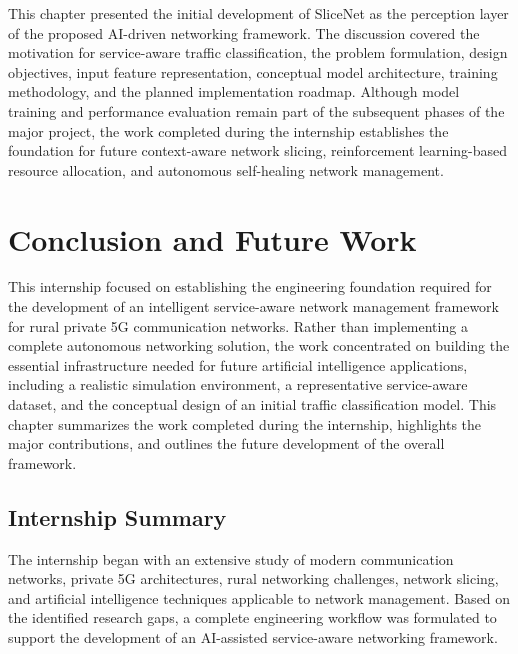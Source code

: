 \documentclass[12pt,a4paper]{report}
\begin{document}
	This chapter presented the initial development of SliceNet as the perception layer of the proposed AI-driven networking framework. The discussion covered the motivation for service-aware traffic classification, the problem formulation, design objectives, input feature representation, conceptual model architecture, training methodology, and the planned implementation roadmap. Although model training and performance evaluation remain part of the subsequent phases of the major project, the work completed during the internship establishes the foundation for future context-aware network slicing, reinforcement learning-based resource allocation, and autonomous self-healing network management.
	
	
	\chapter{Conclusion and Future Work}
	\label{chap:conclusion}
	
	This internship focused on establishing the engineering foundation required for the development of an intelligent service-aware network management framework for rural private 5G communication networks. Rather than implementing a complete autonomous networking solution, the work concentrated on building the essential infrastructure needed for future artificial intelligence applications, including a realistic simulation environment, a representative service-aware dataset, and the conceptual design of an initial traffic classification model. This chapter summarizes the work completed during the internship, highlights the major contributions, and outlines the future development of the overall framework.
	
	\section{Internship Summary}
	
	The internship began with an extensive study of modern communication networks, private 5G architectures, rural networking challenges, network slicing, and artificial intelligence techniques applicable to network management. Based on the identified research gaps, a complete engineering workflow was formulated to support the development of an AI-assisted service-aware networking framework.
	
\end{document}
